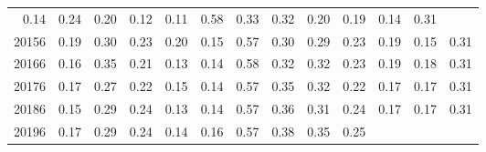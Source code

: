 \begin{table}[!h]
\begin{tabular}{lllllllllllll}
  \multicolumn{1}{|r}{0.14} &
  \multicolumn{1}{r}{0.24} &
  \multicolumn{1}{r}{0.20} &
  \multicolumn{1}{r}{0.12} &
  \multicolumn{1}{r}{0.11} &
  \multicolumn{1}{r}{0.58} &
  \multicolumn{1}{r}{0.33} &
  \multicolumn{1}{r}{0.32} &
  \multicolumn{1}{r}{0.20} &
  \multicolumn{1}{r}{0.19} &
  \multicolumn{1}{r}{0.14} &
  \multicolumn{1}{r}{0.31} \\
\multicolumn{1}{l}{\hspace{1em}20156} &
  \multicolumn{1}{|r}{0.19} &
  \multicolumn{1}{r}{0.30} &
  \multicolumn{1}{r}{0.23} &
  \multicolumn{1}{r}{0.20} &
  \multicolumn{1}{r}{0.15} &
  \multicolumn{1}{r}{0.57} &
  \multicolumn{1}{r}{0.30} &
  \multicolumn{1}{r}{0.29} &
  \multicolumn{1}{r}{0.23} &
  \multicolumn{1}{r}{0.19} &
  \multicolumn{1}{r}{0.15} &
  \multicolumn{1}{r}{0.31} \\
\multicolumn{1}{l}{\hspace{1em}20166} &
  \multicolumn{1}{|r}{0.16} &
  \multicolumn{1}{r}{0.35} &
  \multicolumn{1}{r}{0.21} &
  \multicolumn{1}{r}{0.13} &
  \multicolumn{1}{r}{0.14} &
  \multicolumn{1}{r}{0.58} &
  \multicolumn{1}{r}{0.32} &
  \multicolumn{1}{r}{0.32} &
  \multicolumn{1}{r}{0.23} &
  \multicolumn{1}{r}{0.19} &
  \multicolumn{1}{r}{0.18} &
  \multicolumn{1}{r}{0.31} \\
\multicolumn{1}{l}{\hspace{1em}20176} &
  \multicolumn{1}{|r}{0.17} &
  \multicolumn{1}{r}{0.27} &
  \multicolumn{1}{r}{0.22} &
  \multicolumn{1}{r}{0.15} &
  \multicolumn{1}{r}{0.14} &
  \multicolumn{1}{r}{0.57} &
  \multicolumn{1}{r}{0.35} &
  \multicolumn{1}{r}{0.32} &
  \multicolumn{1}{r}{0.22} &
  \multicolumn{1}{r}{0.17} &
  \multicolumn{1}{r}{0.17} &
  \multicolumn{1}{r}{0.31} \\
\multicolumn{1}{l}{\hspace{1em}20186} &
  \multicolumn{1}{|r}{0.15} &
  \multicolumn{1}{r}{0.29} &
  \multicolumn{1}{r}{0.24} &
  \multicolumn{1}{r}{0.13} &
  \multicolumn{1}{r}{0.14} &
  \multicolumn{1}{r}{0.57} &
  \multicolumn{1}{r}{0.36} &
  \multicolumn{1}{r}{0.31} &
  \multicolumn{1}{r}{0.24} &
  \multicolumn{1}{r}{0.17} &
  \multicolumn{1}{r}{0.17} &
  \multicolumn{1}{r}{0.31} \\
\multicolumn{1}{l}{\hspace{1em}20196} &
  \multicolumn{1}{|r}{0.17} &
  \multicolumn{1}{r}{0.29} &
  \multicolumn{1}{r}{0.24} &
  \multicolumn{1}{r}{0.14} &
  \multicolumn{1}{r}{0.16} &
  \multicolumn{1}{r}{0.57} &
  \multicolumn{1}{r}{0.38} &
  \multicolumn{1}{r}{0.35} &
  \multicolumn{1}{r}{0.25} &

\end{tabular}
\end{table}
